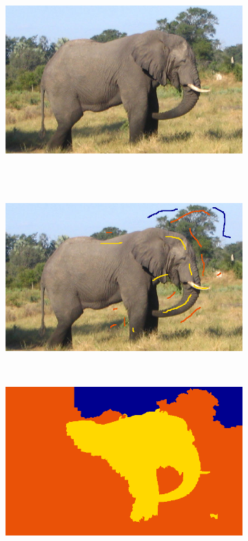 \begin{emodif}
\begin{figure}[htb]
 \centering
 \begin{subfigure}{0.4\textwidth}	
\includegraphics[width=\textwidth]{images/evaluation/fails/im}
 \end{subfigure}
 \\~\\
 \begin{subfigure}{0.4\textwidth}	
\includegraphics[width=\textwidth]{images/evaluation/fails/germes_01}
 \end{subfigure}
 ~
 \begin{subfigure}{0.4\textwidth}	
\includegraphics[width=\textwidth]{images/evaluation/fails/seg_01}

\end{subfigure}
\end{figure}
\end{emodif}
